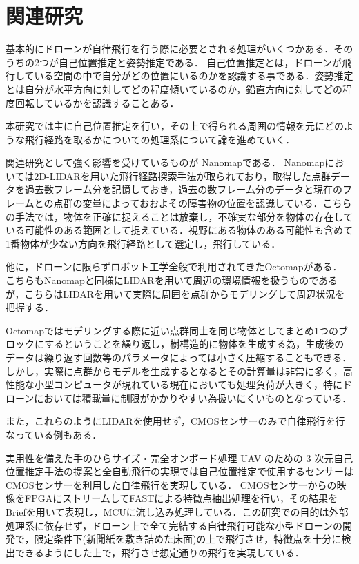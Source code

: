 \documentclass[a4j,10pt]{jsarticle}
\begin{document}
\section{関連研究}
基本的にドローンが自律飛行を行う際に必要とされる処理がいくつかある．そのうちの2つが自己位置推定と姿勢推定である．
自己位置推定とは，ドローンが飛行している空間の中で自分がどの位置にいるのかを認識する事である．姿勢推定とは自分が水平方向に対してどの程度傾いているのか，鉛直方向に対してどの程度回転しているかを認識することある．

本研究では主に自己位置推定を行い，その上で得られる周囲の情報を元にどのような飛行経路を取るかについての処理系について論を進めていく．

関連研究として強く影響を受けているものが Nanomap\cite{Nanomap}である．
Nanomapにおいては2D-LIDARを用いた飛行経路探索手法が取られており，取得した点群データを過去数フレーム分を記憶しておき，過去の数フレーム分のデータと現在のフレームとの点群の変量によっておおよその障害物の位置を認識している．こちらの手法では，物体を正確に捉えることは放棄し，不確実な部分を物体の存在している可能性のある範囲として捉えている．視野にある物体のある可能性も含めて1番物体が少ない方向を飛行経路として選定し，飛行している．

他に，ドローンに限らずロボット工学全般で利用されてきたOctomap\cite{Octomap}がある．
こちらもNanomapと同様にLIDARを用いて周辺の環境情報を扱うものであるが，こちらはLIDARを用いて実際に周囲を点群からモデリングして周辺状況を把握する．

Octomapではモデリングする際に近い点群同士を同じ物体としてまとめ1つのブロックにするということを繰り返し，樹構造的に物体を生成する為，生成後のデータは繰り返す回数等のパラメータによっては小さく圧縮することもできる．
しかし，実際に点群からモデルを生成するとなるとその計算量は非常に多く，高性能な小型コンピュータが現れている現在においても処理負荷が大きく，特にドローンにおいては積載量に制限がかかりやすい為扱いにくいものとなっている．

また，これらのようにLIDARを使用せず，CMOSセンサーのみで自律飛行を行なっている例もある．

実用性を備えた手のひらサイズ・完全オンボード処理 UAV のための 3 次元自己位置推定手法の提案と全自動飛行の実現\cite{SfMDrone}では自己位置推定で使用するセンサーはCMOSセンサーを利用した自律飛行を実現している．
CMOSセンサーからの映像をFPGAにストリームしてFAST\cite{FAST}による特徴点抽出処理を行い，その結果をBrief\cite{Brief}を用いて表現し，MCUに流し込み処理している．この研究での目的は外部処理系に依存せず，ドローン上で全て完結する自律飛行可能な小型ドローンの開発で，限定条件下(新聞紙を敷き詰めた床面)の上で飛行させ，特徴点を十分に検出できるようにした上で，飛行させ想定通りの飛行を実現している．
\end{document}
